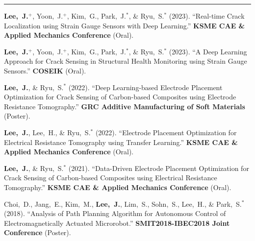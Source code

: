 \documentclass[11pt, a4paper]{article}
\newenvironment{cvsec}[1]{%
  \par\vspace{0.9em}%
  \noindent{\large\bfseries #1}\par\nobreak%
  \vspace{2pt}%
  \noindent\rule{\linewidth}{0.4pt}\par\nobreak%
  \vspace{3pt}%
  \noindent%
}{%
  \vspace{2pt}%
}
\newenvironment{pubrev}[1]{%
  \begin{etaremune}[leftmargin=2em, itemsep=5pt, parsep=0pt, topsep=0pt, partopsep=0pt, start=#1]%
}{%
  \end{etaremune}%
}
\begin{document}
\begin{cvsec}{Conferences}
\begin{pubrev}{13}
\item \textbf{Lee,~J.}$^+$, Yoon,~J.$^+$, Kim,~G., Park,~J.$^*$, \& Ryu,~S.$^*$ (2023).
``Real-time Crack Localization using Strain Gauge Sensors with Deep Learning.''
\textbf{KSME CAE \& Applied Mechanics Conference} (Oral).

\item \textbf{Lee,~J.}$^+$, Yoon,~J.$^+$, Kim,~G., Park,~J.$^*$, \& Ryu,~S.$^*$ (2023).
``A Deep Learning Approach for Crack Sensing in Structural Health Monitoring using Strain Gauge Sensors.''
\textbf{COSEIK} (Oral).

\item \textbf{Lee,~J.}, \& Ryu,~S.$^*$ (2022).
``Deep Learning-based Electrode Placement Optimization for Crack Sensing of Carbon-based Composites using Electrode Resistance Tomography.''
\textbf{GRC Additive Manufacturing of Soft Materials} (Poster).

\item \textbf{Lee,~J.}, Lee,~H., \& Ryu,~S.$^*$ (2022).
``Electrode Placement Optimization for Electrical Resistance Tomography using Transfer Learning.''
\textbf{KSME CAE \& Applied Mechanics Conference} (Oral).

\item \textbf{Lee,~J.}, \& Ryu,~S.$^*$ (2021).
``Data-Driven Electrode Placement Optimization for Crack Sensing of Carbon-based Composites using Electrical Resistance Tomography.''
\textbf{KSME CAE \& Applied Mechanics Conference} (Oral).

\item Choi,~D., Jang,~E., Kim,~M., \textbf{Lee,~J.}, Lim,~S., Sohn,~S., Lee,~H., \& Park,~S.$^*$ (2018).
``Analysis of Path Planning Algorithm for Autonomous Control of Electromagnetically Actuated Microrobot.''
\textbf{SMIT2018-IBEC2018 Joint Conference} (Poster).

\end{pubrev}

\end{cvsec}
\end{document}
